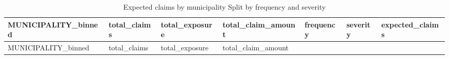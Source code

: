 \documentclass[
  english,
  11pt,
]{article}
\begin{document}
\begin{longtable}[]{@{}
  >{\raggedright\arraybackslash}p{}
  >{\raggedright\arraybackslash}p{}
  >{\raggedright\arraybackslash}p{}
  >{\raggedright\arraybackslash}p{}
  >{\raggedright\arraybackslash}p{}
  >{\raggedright\arraybackslash}p{}
  >{\raggedright\arraybackslash}p{}@{}}
\caption{Expected claims by municipality Split by frequency and
severity}\tabularnewline
\toprule\noalign{}
\begin{minipage}[b]{\linewidth}\raggedright
MUNICIPALITY\_binned
\end{minipage} & \begin{minipage}[b]{\linewidth}\raggedright
total\_claims
\end{minipage} & \begin{minipage}[b]{\linewidth}\raggedright
total\_exposure
\end{minipage} & \begin{minipage}[b]{\linewidth}\raggedright
total\_claim\_amount
\end{minipage} & \begin{minipage}[b]{\linewidth}\raggedright
frequency
\end{minipage} & \begin{minipage}[b]{\linewidth}\raggedright
severity
\end{minipage} & \begin{minipage}[b]{\linewidth}\raggedright
expected\_claims
\end{minipage} \\
\midrule\noalign{}
\endfirsthead
\toprule\noalign{}
\begin{minipage}[b]{\linewidth}\raggedright
MUNICIPALITY\_binned
\end{minipage} & \begin{minipage}[b]{\linewidth}\raggedright
total\_claims
\end{minipage} & \begin{minipage}[b]{\linewidth}\raggedright
total\_exposure
\end{minipage} & \begin{minipage}[b]{\linewidth}\raggedright
total\_claim\_amount
\end{minipage} & \begin{minipage}[b]{\linewidth}\raggedright

\end{minipage}
\end{longtable}
\end{document}
